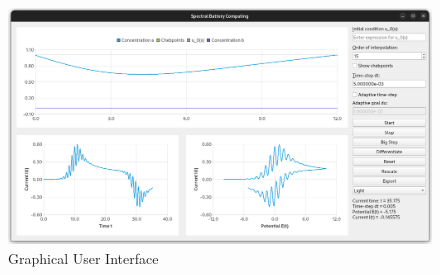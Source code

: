 \documentclass{prettytex/ox/mmsc-special-topic}
\title{\topictitle}
\author{Candidate \candidatenumber}
\date{\today}
\begin{document}
  \pagestyle{plain}
  \mmscSpecialHeader[casestudy]

  \begin{abstract}
    \label{abstract}
    This work shall attempt to
    \vspace*{0.2cm}

    \noindent
    \textbf{Our Goal:}
    Numerically obtain the solution $\{a(x, T), b(x, T)\}$ of
    \vspace*{-0.2cm}
    \begin{subequations}
      \begin{empheq}[left={\empheqlbrace}]{align}
        \label{eq:problem-pde-a} &\frac{\partial a}{\partial t} = D_a \frac{\partial^2 a}{\partial x^2}, & a: \R^+ \times [0, T] \mapsto [0, 1],\, T \in \R^+,\; D_a \in \R^+, \\
        \label{eq:problem-pde-b} &\frac{\partial b}{\partial t} = D_b \frac{\partial^2 b}{\partial x^2}, & b: \R^+ \times [0, T] \mapsto [0, 1],\, D_b \in \R^+,               \\
        \label{eq:problem-bcs} &a(\infty, t) = 1,\; b(\infty, t) = 0,                                  & \text{boundary conditions } \forall\, t \in [0, T]\,,               \\
        \label{eq:problem-ics} &a(x, 0) = 1,\;\; b(x, 0) = 0,                                          & \text{initial conditions }\forall\, x \in (0, \infty)\,,            \\
        \label{eq:problem-mass-conservation} &\frac{\partial a}{\partial x} + D \frac{\partial b}{\partial x} = 0 \,, &
      \end{empheq}
    \end{subequations}
    and optionally, $a(0, t) = 0$, which corresponds to \underline{Chronoamperometry} or $\frac{\partial a}{\partial x}\big|_{x=0} = I(t)$ which is set according to a special \underline{Linear Sweep Voltammetry} method with $I(t)$ given by .
    \vspace*{0.05cm}

    The implementation bla bla
  \end{abstract}

  \begin{figure}[H]
    \centering
    \includegraphics[width=\linewidth]{figures/screenshot.png}
    \caption{Graphical User Interface}
  \end{figure}
\end{document}
